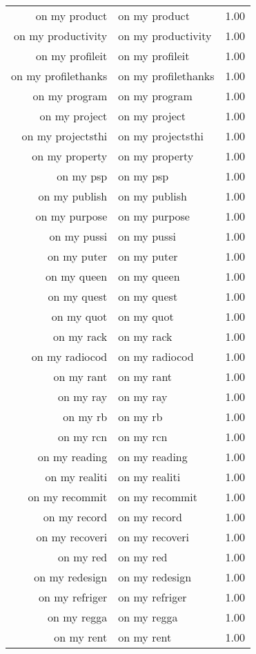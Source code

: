 \begin{table}[ht]
\begin{tabular}{rlr}
  on my product & on my product & 1.00 \\ 
  on my productivity & on my productivity & 1.00 \\ 
  on my profileit & on my profileit & 1.00 \\ 
  on my profilethanks & on my profilethanks & 1.00 \\ 
  on my program & on my program & 1.00 \\ 
  on my project & on my project & 1.00 \\ 
  on my projectsthi & on my projectsthi & 1.00 \\ 
  on my property & on my property & 1.00 \\ 
  on my psp & on my psp & 1.00 \\ 
  on my publish & on my publish & 1.00 \\ 
  on my purpose & on my purpose & 1.00 \\ 
  on my pussi & on my pussi & 1.00 \\ 
  on my puter & on my puter & 1.00 \\ 
  on my queen & on my queen & 1.00 \\ 
  on my quest & on my quest & 1.00 \\ 
  on my quot & on my quot & 1.00 \\ 
  on my rack & on my rack & 1.00 \\ 
  on my radiocod & on my radiocod & 1.00 \\ 
  on my rant & on my rant & 1.00 \\ 
  on my ray & on my ray & 1.00 \\ 
  on my rb & on my rb & 1.00 \\ 
  on my rcn & on my rcn & 1.00 \\ 
  on my reading & on my reading & 1.00 \\ 
  on my realiti & on my realiti & 1.00 \\ 
  on my recommit & on my recommit & 1.00 \\ 
  on my record & on my record & 1.00 \\ 
  on my recoveri & on my recoveri & 1.00 \\ 
  on my red & on my red & 1.00 \\ 
  on my redesign & on my redesign & 1.00 \\ 
  on my refriger & on my refriger & 1.00 \\ 
  on my regga & on my regga & 1.00 \\ 
  on my rent & on my rent & 1.00 \\ 

\end{tabular}
\end{table}
